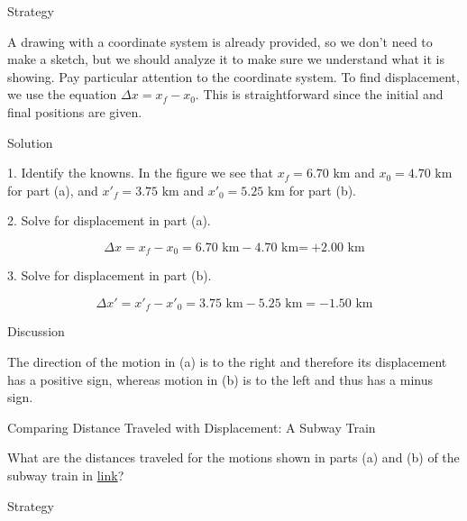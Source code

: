 \documentclass[
]{book}
\newenvironment{tinysection}{}{}
\begin{document}
\begin{tinysection}

{Strategy}

\end{tinysection}

A drawing with a coordinate system is already provided, so we don't
need to make a sketch, but we should analyze it to make sure we
understand what it is showing. Pay particular attention to the
coordinate system. To find displacement, we use the equation
\({\Delta x = {x_{f} - x_{0}}}{}\). This is straightforward since the
initial and final positions are given.

\begin{tinysection}

{Solution}

\end{tinysection}

1. Identify the knowns. In the figure we see that
\({x_{f} =}\text{6.70\ km}\) and \({x_{0} =}\text{4.70\ km}\) for part (a),
and \({{x\prime}_{f} = 3}\text{.75\ km}\) and
\({{x\prime}_{0} = 5}\text{.25\ km}\) for part (b).

2. Solve for displacement in part (a).

\leavevmode\hypertarget{import-auto-id2400875}{}%
\[{{{\Delta x = {x_{f} - x_{0}}} = 6}\text{.}{\text{70\ km} - 4}\text{.}\text{70\ km}\text{=}\ \text{+}2\text{.}\text{00\ km}}{}\]

3. Solve for displacement in part (b).

\leavevmode\hypertarget{import-auto-id2589758}{}%
\[\Delta x\prime{{= {{x\prime}_{f} - {x\prime}_{0}}} = \text{3.75\ km} - \text{5.25\ km} = - \text{1.50\ km}}\]

\begin{tinysection}

{Discussion}

\end{tinysection}

The direction of the motion in (a) is to the right and therefore its
displacement has a positive sign, whereas motion in (b) is to the left
and thus has a minus sign.

\hypertarget{fs-id4082275}{}
Comparing Distance Traveled with Displacement: A Subway Train

What are the distances traveled for the motions shown in parts (a) and
(b) of the subway train in
\protect\hyperlink{import-auto-id2590556}{link}?

\begin{tinysection}

{Strategy}

\end{tinysection}
\end{document}
